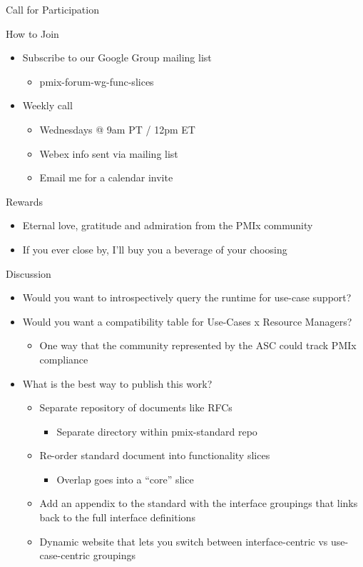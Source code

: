 \documentclass[presentation]{beamer}
\begin{document}
\begin{frame}[label={sec:org1c91c97}]{Call for Participation}
\begin{block}{How to Join}
\begin{itemize}
\item Subscribe to our Google Group mailing list
\begin{itemize}
\item pmix-forum-wg-func-slices
\end{itemize}
\item Weekly call
\begin{itemize}
\item Wednesdays @ 9am PT / 12pm ET
\item Webex info sent via mailing list
\item Email me for a calendar invite
\end{itemize}
\end{itemize}
\end{block}
\begin{block}{Rewards}
\begin{itemize}
\item Eternal love, gratitude and admiration from the PMIx community
\item If you ever close by, I'll buy you a beverage of your choosing
\end{itemize}
\end{block}
\end{frame}
\begin{frame}[label={sec:org5f116e8}]{Discussion}
\begin{itemize}
\item Would you want to introspectively query the runtime for use-case support?
\item Would you want a compatibility table for Use-Cases x Resource Managers?
\begin{itemize}
\item One way that the community represented by the ASC could track PMIx compliance
\end{itemize}
\item What is the best way to publish this work?
\begin{itemize}
\item Separate repository of documents like RFCs
\begin{itemize}
\item Separate directory within pmix-standard repo
\end{itemize}
\item Re-order standard document into functionality slices
\begin{itemize}
\item Overlap goes into a “core” slice
\end{itemize}
\item Add an appendix to the standard with the interface groupings that links back to the full interface definitions
\item Dynamic website that lets you switch between interface-centric vs use-case-centric groupings
\end{itemize}
\end{itemize}
\end{frame}
\end{document}
